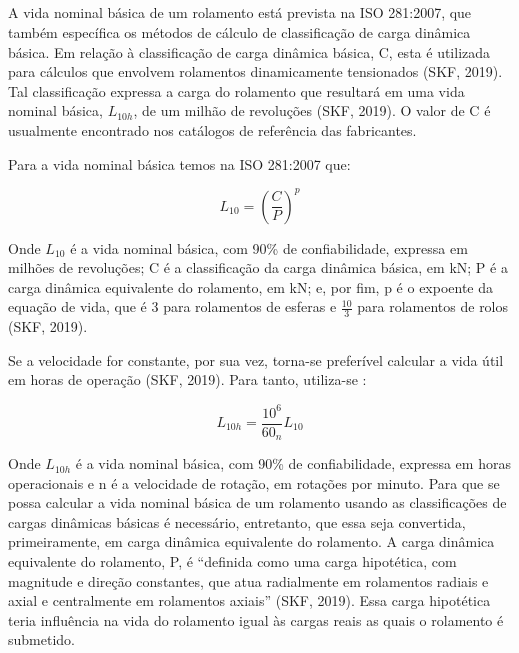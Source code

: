 \documentclass[
	12pt,				
	oneside,			
	a4paper,			
	english,			
	brazil,			
	]{abntex2ppgsi}
\begin{document}
\subsection{}

A vida nominal básica de um rolamento está prevista na ISO 281:2007, que também específica os métodos de cálculo de classificação de carga dinâmica básica. Em relação à classificação de carga dinâmica básica, C, esta é utilizada para cálculos que envolvem rolamentos dinamicamente tensionados (SKF, 2019). Tal classificação expressa a carga do rolamento que resultará em uma vida nominal básica, $L_{10h}$, de um milhão de revoluções (SKF, 2019). O valor de C é usualmente encontrado nos catálogos de referência das fabricantes.   

Para a vida nominal básica temos na ISO 281:2007 que:

\begin{equation}
	L_{10}= \left ( \frac{C}{P} \right )^{p}
	\label{eq: Vida Nominal Básica}
\end{equation}

Onde $L_{10}$ é a vida nominal básica, com 90\% de confiabilidade, expressa em milhões de revoluções; C é a classificação da carga dinâmica básica, em kN; P é a carga dinâmica equivalente do rolamento, em kN; e, por fim, p é o expoente da equação de vida, que é 3 para rolamentos de esferas e $ \frac{10}{3}$ para rolamentos de rolos (SKF, 2019).

Se a velocidade for constante, por sua vez, torna-se preferível calcular a vida útil em horas de operação (SKF, 2019). Para tanto, utiliza-se :

\begin{equation}
	L_{10h}= \frac{10^{6}}{60_{n}}L_{10}
	\label{eq: Vida Útil em Horas}
\end{equation}

Onde $L_{10h}$ é a vida nominal básica, com 90\% de confiabilidade, expressa em horas operacionais e n é a velocidade de rotação, em rotações por minuto. 
Para que se possa calcular a vida nominal básica de um rolamento usando as classificações de cargas dinâmicas básicas é necessário, entretanto, que essa seja convertida, primeiramente, em carga dinâmica equivalente do rolamento. A carga dinâmica equivalente do rolamento, P, é “definida como uma carga hipotética, com magnitude e direção constantes, que atua radialmente em rolamentos radiais e axial e centralmente em rolamentos axiais” (SKF, 2019). Essa carga hipotética teria influência na vida do rolamento igual às cargas reais as quais o rolamento é submetido.
\end{document}
